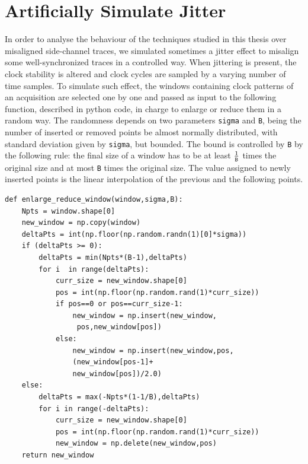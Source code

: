 \chapter{Artificially Simulate Jitter}\label{appendix:artificial_jitter}


In order to analyse the behaviour of the techniques studied in this thesis over misaligned side-channel traces, we simulated sometimes a jitter effect to misalign some well-synchronized traces in a controlled way. When jittering is present, the clock stability is altered and clock cycles are sampled by a varying number of time samples. To simulate such effect, the windows containing clock patterns of an acquisition are selected one by one and passed as input to the following function, described in python code, in charge to enlarge or reduce them in a random way. The randomness depends on two parameters \texttt{sigma} and \texttt{B}, being the number of inserted or removed points be almost normally distributed, with standard deviation given by \texttt{sigma}, but bounded. The bound is controlled by \texttt{B} by the following rule: the final size of a window has to be at least $\frac{1}{\text{\texttt{B}}}$ times the original size and at most \texttt{B} times the original size. The value assigned to newly inserted points is the linear interpolation of the previous and the following points.

\begin{lstlisting}[frame=single]
def enlarge_reduce_window(window,sigma,B): 
    Npts = window.shape[0]
    new_window = np.copy(window)
    deltaPts = int(np.floor(np.random.randn(1)[0]*sigma))
    if (deltaPts >= 0):
        deltaPts = min(Npts*(B-1),deltaPts)
        for i  in range(deltaPts):
            curr_size = new_window.shape[0]
            pos = int(np.floor(np.random.rand(1)*curr_size))
            if pos==0 or pos==curr_size-1:
                new_window = np.insert(new_window,
                 pos,new_window[pos])
            else:
                new_window = np.insert(new_window,pos, 
                (new_window[pos-1]+
                new_window[pos])/2.0)
    else:
        deltaPts = max(-Npts*(1-1/B),deltaPts)
        for i in range(-deltaPts):
            curr_size = new_window.shape[0]
            pos = int(np.floor(np.random.rand(1)*curr_size))
            new_window = np.delete(new_window,pos)
    return new_window
    
\end{lstlisting}

